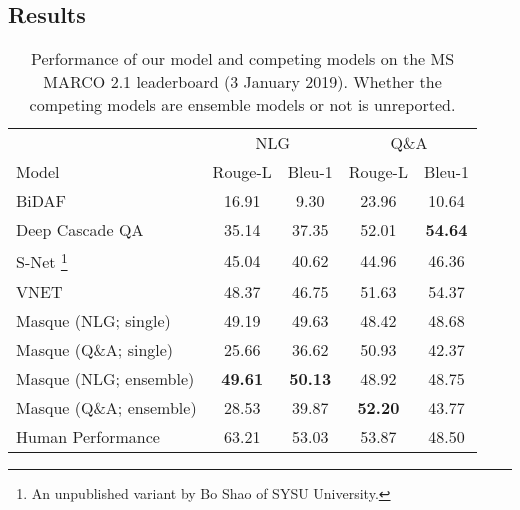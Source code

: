 \documentclass[11pt,a4paper]{article}
\theoremstyle{mydef}
\theoremstyle{myprob}
\begin{document}
\subsection{Results}

\begin{table}
\centering
{\small \tabcolsep=1.4pt
\begin{tabular}{l|cc|cc}
\hline
 & \multicolumn{2}{c|}{NLG} & \multicolumn{2}{c}{Q\&A}\\ %
Model & Rouge-L & Bleu-1 & Rouge-L & Bleu-1\\ \hline
BiDAF \citeyearpar{SeoKFH17} & 16.91 & 9.30 & 23.96 & 10.64 \\
Deep Cascade QA \citeyearpar{YanAAAI19} & 35.14 & 37.35 &  52.01 & {\bf 54.64}\\ 
S-Net \citeyearpar{TanWYDLZ18}\footnote{An unpublished variant by Bo Shao of SYSU University.}   & 45.04 & 40.62 & 44.96 & 46.36\\
VNET \citeyearpar{WuWLHWLLL18}  & 48.37 & 46.75 & 51.63 & 54.37\\ \hline
Masque (NLG; single) & 49.19 &  49.63 & 48.42 & 48.68\\
Masque (Q\&A; single) & 25.66 & 36.62 & 50.93 & 42.37\\ 
\hline
Masque (NLG; ensemble) & {\bf 49.61} & {\bf 50.13} & 48.92& 48.75 \\
Masque (Q\&A; ensemble) & 28.53 & 39.87 & {\bf 52.20} & 43.77 \\ 
\hline
Human Performance & 63.21 & 53.03  & 53.87 & 48.50\\
\hline
\end{tabular}
}
\caption{Performance of our model and competing models on the MS MARCO 2.1 leaderboard (3 January 2019). 
Whether the competing models are ensemble models or not is unreported. }
\label{tb:nlg-leaderboard}
\end{table}
\end{document}
